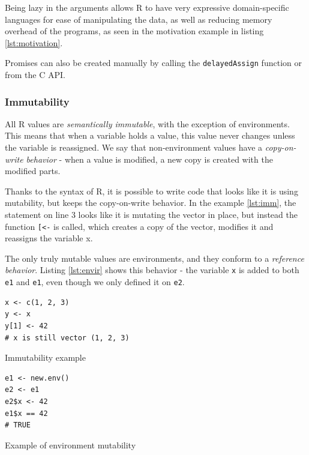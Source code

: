 Being lazy in the arguments allows R to have very expressive domain-specific languages for ease of manipulating the data, as well as reducing memory overhead of the programs, as seen in the motivation example in listing \ref{lst:motivation}.

Promises can also be created manually by calling the \texttt{delayedAssign} function or from the C API.

\subsubsection*{Immutability}

All R values are \textit{semantically immutable}, with the exception of environments. This means that when a variable holds a value, this value never changes unless the variable is reassigned. We say that non-environment values have a \textit{copy-on-write behavior} - when a value is modified, a new copy is created with the modified parts.

Thanks to the syntax of R, it is possible to write code that looks like it is using mutability, but keeps the copy-on-write behavior. In the example \ref{lst:imm}, the statement on line 3 looks like it is mutating the vector in place, but instead the function \texttt{[<-} is called, which creates a copy of the vector, modifies it and reassigns the variable x.

The only truly mutable values are environments, and they conform to a \textit{reference behavior}. Listing \ref{lst:envir} shows this behavior - the variable \texttt{x} is added to both \texttt{e1} and \texttt{e1}, even though we only defined it on \texttt{e2}.

\begin{listing}
	\centering
	\begin{minipage}{0.47\textwidth}
		\begin{verbatim}
x <- c(1, 2, 3)
y <- x
y[1] <- 42
# x is still vector (1, 2, 3)
      \end{verbatim}
		\caption{Immutability example}\label{lst:imm}
	\end{minipage}
	\hfill
	\begin{minipage}{0.47\textwidth}
		\begin{verbatim}
e1 <- new.env()
e2 <- e1
e2$x <- 42
e1$x == 42
# TRUE
      \end{verbatim}
		\caption{Example of environment mutability}\label{lst:envir}
	\end{minipage}
\end{listing}

